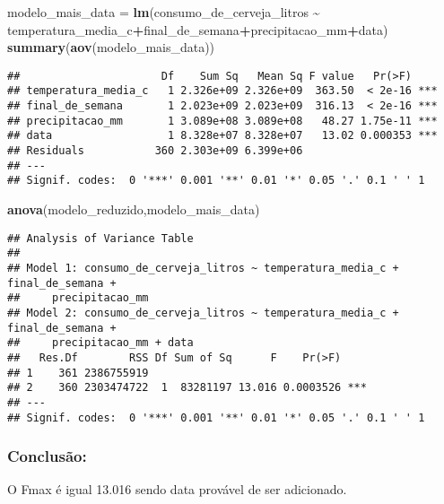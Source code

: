 \documentclass[
]{article}
\newenvironment{Shaded}{\begin{snugshade}}{\end{snugshade}}
\newcommand{\FunctionTok}[1]{\textcolor[rgb]{0.13,0.29,0.53}{\textbf{#1}}}
\newcommand{\NormalTok}[1]{#1}
\newcommand{\OtherTok}[1]{\textcolor[rgb]{0.56,0.35,0.01}{#1}}
\newcommand{\SpecialCharTok}[1]{\textcolor[rgb]{0.81,0.36,0.00}{\textbf{#1}}}
\begin{document}
\begin{Shaded}
\begin{Highlighting}[]
\NormalTok{modelo\_mais\_data }\OtherTok{=} \FunctionTok{lm}\NormalTok{(consumo\_de\_cerveja\_litros }\SpecialCharTok{\textasciitilde{}} 
\NormalTok{                        temperatura\_media\_c}\SpecialCharTok{+}\NormalTok{final\_de\_semana}\SpecialCharTok{+}\NormalTok{precipitacao\_mm}\SpecialCharTok{+}\NormalTok{data)}
\FunctionTok{summary}\NormalTok{(}\FunctionTok{aov}\NormalTok{(modelo\_mais\_data))}
\end{Highlighting}
\end{Shaded}

\begin{verbatim}
##                      Df    Sum Sq   Mean Sq F value   Pr(>F)    
## temperatura_media_c   1 2.326e+09 2.326e+09  363.50  < 2e-16 ***
## final_de_semana       1 2.023e+09 2.023e+09  316.13  < 2e-16 ***
## precipitacao_mm       1 3.089e+08 3.089e+08   48.27 1.75e-11 ***
## data                  1 8.328e+07 8.328e+07   13.02 0.000353 ***
## Residuals           360 2.303e+09 6.399e+06                     
## ---
## Signif. codes:  0 '***' 0.001 '**' 0.01 '*' 0.05 '.' 0.1 ' ' 1
\end{verbatim}

\begin{Shaded}
\begin{Highlighting}[]
\FunctionTok{anova}\NormalTok{(modelo\_reduzido,modelo\_mais\_data)}
\end{Highlighting}
\end{Shaded}

\begin{verbatim}
## Analysis of Variance Table
## 
## Model 1: consumo_de_cerveja_litros ~ temperatura_media_c + final_de_semana + 
##     precipitacao_mm
## Model 2: consumo_de_cerveja_litros ~ temperatura_media_c + final_de_semana + 
##     precipitacao_mm + data
##   Res.Df        RSS Df Sum of Sq      F    Pr(>F)    
## 1    361 2386755919                                  
## 2    360 2303474722  1  83281197 13.016 0.0003526 ***
## ---
## Signif. codes:  0 '***' 0.001 '**' 0.01 '*' 0.05 '.' 0.1 ' ' 1
\end{verbatim}

\hypertarget{conclusuxe3o-7}{%
\subsubsection{Conclusão:}\label{conclusuxe3o-7}}

O Fmax é igual 13.016 sendo data provável de ser adicionado.
\end{document}
